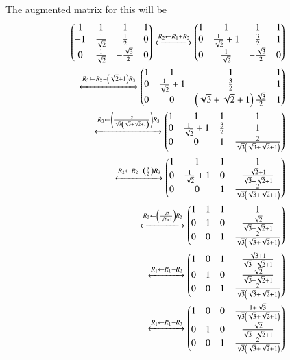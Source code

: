 \documentclass[journal]{IEEEtran}
\begin{document}
The augmented matrix for this will be
\begin{align}
  \begin{pmatrix}1 & 1 & 1 & 1\\-1 & \frac{1}{\sqrt{2}} & \frac{1}{2} & 0\\0 & \frac{1}{\sqrt{2}} & -\frac{\sqrt{3}}{2} & 0\end{pmatrix} \xleftrightarrow[]{R_2 \leftarrow {R_1+R_2}}\begin{pmatrix}1 & 1 & 1 & 1\\0 & \frac{1}{\sqrt{2}}+1 & \frac{3}{2} & 1\\0 & \frac{1}{\sqrt{2}} & -\frac{\sqrt{3}}{2} & 0\end{pmatrix}\\
  \xleftrightarrow[]{R_3 \leftarrow {R_2-\ensuremath{\left(\sqrt{2}+1\right)}R_3}}\begin{pmatrix}1 & 1 & 1 & 1\\0 & \frac{1}{\sqrt{2}}+1 & \frac{3}{2} & 1\\0 & 0 & \left(\sqrt{3}+\sqrt{2}+1\right)\frac{\sqrt{3}}{2} & 1\end{pmatrix}\\
  \xleftrightarrow[]{R_3 \leftarrow {\ensuremath{\left(\frac{2}{\sqrt{3}\left(\sqrt{3}+\sqrt{2}+1\right)}\right)}R_3}}\begin{pmatrix}1 & 1 & 1 & 1\\0 & \frac{1}{\sqrt{2}}+1 & \frac{3}{2} & 1\\0 & 0 & 1 & \frac{2}{\sqrt{3}\left(\sqrt{3}+\sqrt{2}+1\right)}\end{pmatrix}\\
  \xleftrightarrow[]{R_2 \leftarrow {R_2-\ensuremath{\left(\frac{3}{2}\right)}R_3}}\begin{pmatrix}1 & 1 & 1 & 1\\0 & \frac{1}{\sqrt{2}}+1 & 0 & \frac{\sqrt{2}+1}{\sqrt{3}+\sqrt{2}+1}\\0 & 0 & 1 & \frac{2}{\sqrt{3}\left(\sqrt{3}+\sqrt{2}+1\right)}\end{pmatrix}\\
  \xleftrightarrow[]{R_2 \leftarrow \ensuremath{\left(\frac{\sqrt{2}}{\sqrt{2}+1}\right)}R_2}\begin{pmatrix}1 & 1 & 1 & 1\\0 & 1 & 0 & \frac{\sqrt{2}}{\sqrt{3}+\sqrt{2}+1}\\0 & 0 & 1 & \frac{2}{\sqrt{3}\left(\sqrt{3}+\sqrt{2}+1\right)}\end{pmatrix}\\
  \xleftrightarrow[]{R_1 \leftarrow R_1-R_2}\begin{pmatrix}1 & 0 & 1 & \frac{\sqrt{3}+1}{\sqrt{3}+\sqrt{2}+1}\\0 & 1 & 0 & \frac{\sqrt{2}}{\sqrt{3}+\sqrt{2}+1}\\0 & 0 & 1 & \frac{2}{\sqrt{3}\left(\sqrt{3}+\sqrt{2}+1\right)}\end{pmatrix}\\
  \xleftrightarrow[]{R_1 \leftarrow R_1-R_3}\begin{pmatrix}1 & 0 & 0 & \frac{1+\sqrt{3}}{\sqrt{3}\left(\sqrt{3}+\sqrt{2}+1\right)}\\0 & 1 & 0 & \frac{\sqrt{2}}{\sqrt{3}+\sqrt{2}+1}\\0 & 0 & 1 & \frac{2}{\sqrt{3}\left(\sqrt{3}+\sqrt{2}+1\right)}\end{pmatrix}\\
\end{align}
\end{document}
